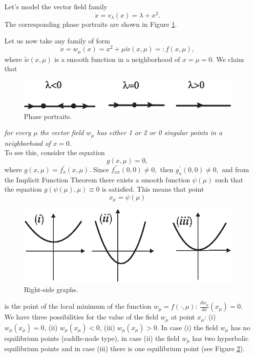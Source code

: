 \begin{example}\label{example:3.3}
	Let's model the vector field family
	\begin{equation}
	\label{3.1}
	\dot{x}=v_{\lambda }(x)=\lambda +x^{2}.
	\end{equation}
	The corresponding phase portraits are shown in Figure \ref{fig:3.2}.
	
	Let us now take any family of form
	\begin{equation}
	\label{3.2}
	\dot{x}=w_{\mu }(x)=x^{2}+\mu \tilde{w}(x,\mu )=:f(x,\mu ),
	\end{equation}
	where $\tilde{w}(x,\mu )$  is a smooth function in a neighborhood of $x=\mu
	=0 $. We claim that 
	\begin{figure}[!ht]
		\centering
		\includegraphics [scale=1]{jtr32}
		\caption{Phase portraits.}
		\label{fig:3.2}
	\end{figure}

	\emph{for every $\mu$ the vector field $w_{\mu }$ has either 1 or 2 or 0 singular points in a neighborhood of $x = 0$.}\\
	To see this, consider the equation
	$$
	g(x,\mu )=0,
	$$
	where $g(x,\mu )=f_{x}^{\prime }(x,\mu ).$ Since $f_{xx}^{\prime
	\prime }(0,0)\not=0,$ then $g_{x}^{\prime }(0,0)\not=0,$ and from the Implicit Function Theorem there exists a smooth function $\psi (\mu )$ such that the equation $g(\psi (\mu ),\mu )\equiv 0$ is satisfied. This means that point
	$$
	x_{\mu }=\psi (\mu )
	$$
	\begin{figure}[!ht]
		\centering
		\includegraphics [scale=1]{jtr33}
		\caption{Right-side graphs.}
		\label{fig:3.3}
	\end{figure}
	is the point of the local minimum of the function $w_{\mu }=f(\cdot ,\mu ):\ \frac{dw_{\mu }}{dx}(x_{\mu })=0.$ We have three possibilities for the value of the field $w_{\mu }$ at point $x_{\mu }$: (i) $w_{\mu }(x_{\mu })=0$, (ii) $w_{\mu }(x_{\mu })<0$, (iii) $w_{\mu
	}(x_{\mu })>0$. In case (i) the field $w_{\mu }$ has no equilibrium points (saddle-node type), in case (ii) the field $w_{\mu }$ has two hyperbolic equilibrium points and in case (iii) there is one equilibrium point (see Figure \ref{fig:3.3}).


\end{example}
